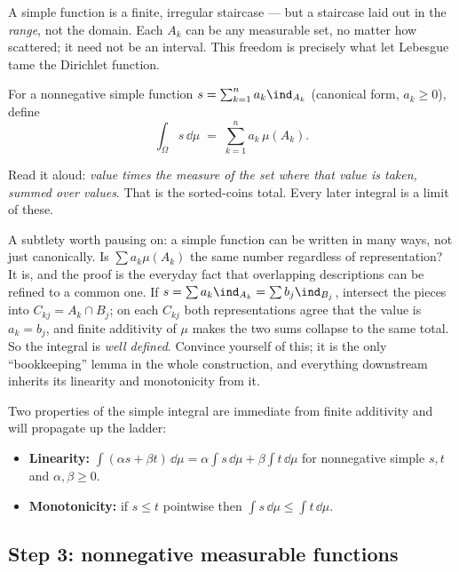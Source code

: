 A simple function is a finite, irregular staircase --- but a staircase laid out
in the \emph{range}, not the domain. Each $A_k$ can be any measurable set, no
matter how scattered; it need not be an interval. This freedom is precisely what
let Lebesgue tame the Dirichlet function.

\begin{definition}
\label{ch37:def-int-simple}
For a nonnegative simple function $s=\sum_{k=1}^n a_k \ind_{A_k}$ (canonical
form, $a_k\ge 0$), define
\[
  \int_\Omega s \,\dd\mu \;=\; \sum_{k=1}^n a_k\,\mu(A_k).
\]
\end{definition}

Read it aloud: \emph{value times the measure of the set where that value is
taken, summed over values}. That is the sorted-coins total. Every later integral
is a limit of these.

\begin{walkbox}
A subtlety worth pausing on: a simple function can be written in many ways, not
just canonically. Is $\sum a_k\mu(A_k)$ the same number regardless of
representation? It is, and the proof is the everyday fact that overlapping
descriptions can be refined to a common one. If $s=\sum a_k\ind_{A_k}=\sum
b_j\ind_{B_j}$, intersect the pieces into $C_{kj}=A_k\cap B_j$; on each
$C_{kj}$ both representations agree that the value is $a_k=b_j$, and finite
additivity of $\mu$ makes the two sums collapse to the same total. So the
integral is \emph{well defined}. Convince yourself of this; it is the only
``bookkeeping'' lemma in the whole construction, and everything downstream
inherits its linearity and monotonicity from it.
\end{walkbox}

Two properties of the simple integral are immediate from finite additivity and
will propagate up the ladder:
\begin{itemize}
\item \textbf{Linearity:} $\int (\alpha s + \beta t)\,\dd\mu = \alpha\int
  s\,\dd\mu + \beta\int t\,\dd\mu$ for nonnegative simple $s,t$ and
  $\alpha,\beta\ge 0$.
\item \textbf{Monotonicity:} if $s\le t$ pointwise then $\int s\,\dd\mu \le \int
  t\,\dd\mu$.
\end{itemize}

\subsection{Step 3: nonnegative measurable functions}

